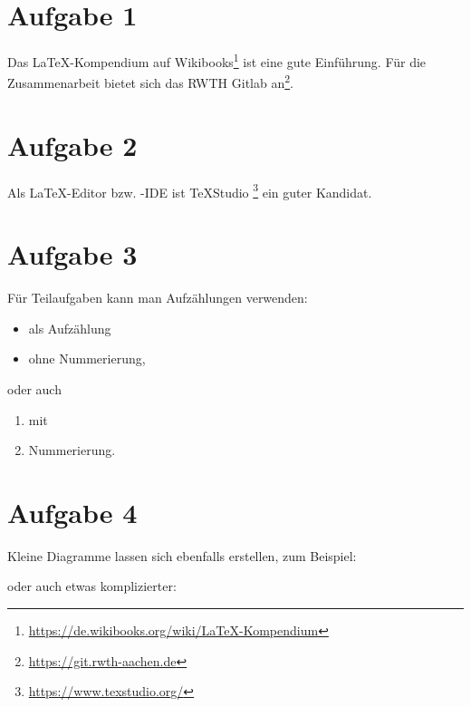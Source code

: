 \documentclass[a4paper,11pt]{scrartcl}
\begin{document}
	

	
	
	\section*{Aufgabe 1}
	
	Das \LaTeX{}-Kompendium auf Wikibooks\footnote{\url{https://de.wikibooks.org/wiki/LaTeX-Kompendium}} ist eine gute Einführung.
	Für die Zusammenarbeit bietet sich das RWTH Gitlab an\footnote{\url{https://git.rwth-aachen.de}}.
	
	
	\section*{Aufgabe 2}
	
	Als \LaTeX{}-Editor bzw. -IDE ist TeXStudio \footnote{\url{https://www.texstudio.org/}} ein guter Kandidat.
	

	
	\section*{Aufgabe 3}
	
		Für Teilaufgaben kann man Aufzählungen verwenden:
	\begin{itemize}
		\item als Aufzählung
		\item ohne Nummerierung,
	\end{itemize}
	oder auch
	\begin{enumerate}
		\item mit
		\item Nummerierung.
	\end{enumerate}
	
	\section*{Aufgabe 4}
	
	Kleine Diagramme lassen sich ebenfalls erstellen, zum Beispiel:
	
	\begin{center}
	\end{center}
	
	oder auch etwas komplizierter:
	
\end{document}
